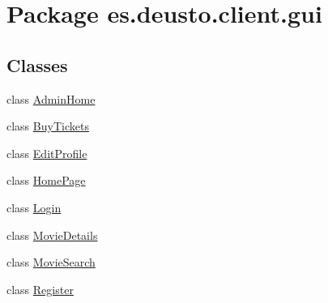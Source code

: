 \hypertarget{namespacees_1_1deusto_1_1client_1_1gui}{}\section{Package es.\+deusto.\+client.\+gui}
\label{namespacees_1_1deusto_1_1client_1_1gui}
\subsection*{Classes}
\begin{DoxyCompactItemize}
\item 
class \mbox{\hyperlink{classes_1_1deusto_1_1client_1_1gui_1_1_admin_home}{Admin\+Home}}
\item 
class \mbox{\hyperlink{classes_1_1deusto_1_1client_1_1gui_1_1_buy_tickets}{Buy\+Tickets}}
\item 
class \mbox{\hyperlink{classes_1_1deusto_1_1client_1_1gui_1_1_edit_profile}{Edit\+Profile}}
\item 
class \mbox{\hyperlink{classes_1_1deusto_1_1client_1_1gui_1_1_home_page}{Home\+Page}}
\item 
class \mbox{\hyperlink{classes_1_1deusto_1_1client_1_1gui_1_1_login}{Login}}
\item 
class \mbox{\hyperlink{classes_1_1deusto_1_1client_1_1gui_1_1_movie_details}{Movie\+Details}}
\item 
class \mbox{\hyperlink{classes_1_1deusto_1_1client_1_1gui_1_1_movie_search}{Movie\+Search}}
\item 
class \mbox{\hyperlink{classes_1_1deusto_1_1client_1_1gui_1_1_register}{Register}}
\end{DoxyCompactItemize}
